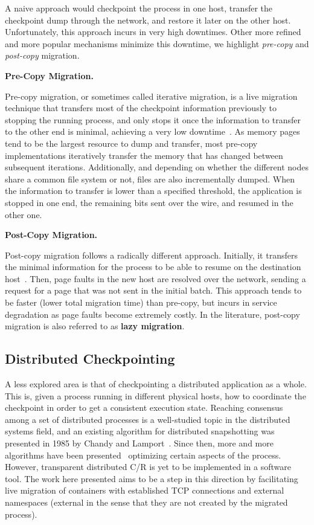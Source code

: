 A naive approach would checkpoint the process in one host, transfer the checkpoint dump through the network, and restore it later on the other host.
Unfortunately, this approach incurs in very high downtimes.
Other more refined and more popular mechanisms minimize this downtime, we highlight \textit{pre-copy} and \textit{post-copy} migration.

\textbf{Pre-Copy Migration.}

Pre-copy migration, or sometimes called iterative migration, is a live migration technique that transfers most of the checkpoint information previously to stopping the running process, and only stops it once the information to transfer to the other end is minimal, achieving a very low downtime~\cite{Bradford2007}.
As memory pages tend to be the largest resource to dump and transfer, most pre-copy implementations iteratively transfer the memory that has changed between subsequent iterations. 
Additionally, and depending on whether the different nodes share a common file system or not, files are also incrementally dumped.
When the information to transfer is lower than a specified threshold, the application is stopped in one end, the remaining bits sent over the wire, and resumed in the other one.

\textbf{Post-Copy Migration.}

Post-copy migration follows a radically different approach.
Initially, it transfers the minimal information for the process to be able to resume on the destination host~\cite{Shirbam2012}.
Then, page faults in the new host are resolved over the network, sending a request for a page that was not sent in the initial batch.
This approach tends to be faster (lower total migration time) than pre-copy, but incurs in service degradation as page faults become extremely costly.
In the literature, post-copy migration is also referred to as \textbf{lazy migration}.

\subsection{Distributed Checkpointing}

A less explored area is that of checkpointing a distributed application as a whole.
This is, given a process running in different physical hosts, how to coordinate the checkpoint in order to get a consistent execution state.
Reaching consensus among a set of distributed processes is a well-studied topic in the distributed systems field, and an existing algorithm for distributed snapshotting was presented in 1985 by Chandy and Lamport~\cite{Lamport1985}.
Since then, more and more algorithms have been presented~\cite{Raynal2013,Kshemkalyani2008} optimizing certain aspects of the process.
However, transparent distributed C/R is yet to be implemented in a software tool.
The work here presented aims to be a step in this direction by facilitating live migration of containers with established TCP connections and external namespaces (external in the sense that they are not created by the migrated process).

